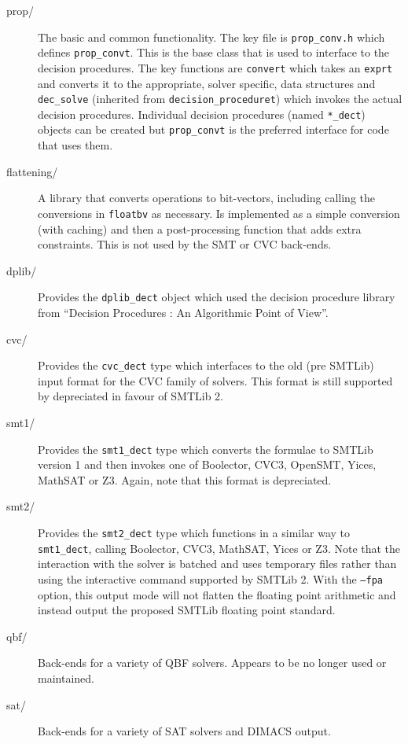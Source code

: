 \documentclass{article}
\newcommand{\dir}[1]{\texttt{#1}}
\newcommand{\file}[1]{\texttt{#1}}
\newcommand{\code}[1]{\texttt{#1}}
\begin{document}
\begin{description}

  \item[prop/]{The basic and common functionality.  The key file is
    \file{prop\_conv.h} which defines \code{prop\_convt}.  This is the
     base class that is used to interface to the decision procedures.
     The key functions are \code{convert} which takes an \code{exprt}
     and converts it to the appropriate, solver specific, data
     structures and \code{dec\_solve} (inherited from
     \code{decision\_proceduret}) which invokes the actual decision
     procedures.  Individual decision procedures (named
     \code{*\_dect}) objects can be created but \code{prop\_convt} is
     the preferred interface for code that uses them.}  

  \item[flattening/]{A library that converts operations to
    bit-vectors, including calling the conversions in \dir{floatbv} as
    necessary.  Is implemented as a simple conversion (with caching)
    and then a post-processing function that adds extra constraints.
    This is not used by the SMT or CVC back-ends.}  


  \item[dplib/]{Provides the \code{dplib\_dect} object which used the
    decision procedure library from ``Decision Procedures : An
    Algorithmic Point of View''.}  

  \item[cvc/]{Provides the \code{cvc\_dect} type which interfaces to
    the old (pre SMTLib) input format for the CVC family of solvers.
    This format is still supported by depreciated in favour of SMTLib 2.}  

  \item[smt1/]{Provides the \code{smt1\_dect} type which converts the
    formulae to SMTLib version 1 and then invokes one of Boolector,
    CVC3, OpenSMT, Yices, MathSAT or Z3.  Again, note that this format
    is depreciated.}  

  \item[smt2/]{Provides the \code{smt2\_dect} type which functions in
    a similar way to \code{smt1\_dect}, calling Boolector, CVC3,
    MathSAT, Yices or Z3.  Note that the interaction with the solver
    is batched and uses temporary files rather than using the
    interactive command supported by SMTLib 2.  With the \code{--fpa}
    option, this output mode will not flatten the floating point
    arithmetic and instead output the proposed SMTLib floating point
    standard.}
  
  \item[qbf/]{Back-ends for a variety of QBF solvers.  Appears to be
    no longer used or maintained.}
  
  \item[sat/]{Back-ends for a variety of SAT solvers and DIMACS
    output.}  
\end{description}
\end{document}
